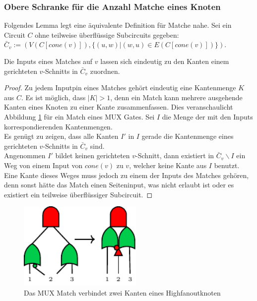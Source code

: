 \documentclass[11pt, a4paper, german]{article}
\begin{document}
\subsubsection{Obere Schranke für die Anzahl Matche eines Knoten}
\label{subsubsec:anzahl_matchings}
Folgendes Lemma legt eine äquivalente Definition für Matche nahe.
Sei ein Circuit $C$ ohne teilweise überflüssige Subcircuits gegeben: \\$\bar{C}_v := (V(C[cone(v)]), \{ (u,w) | (w,u) \in E(C[cone(v)])\})$.
\begin{lemma}{Die Inputs eines Matches auf $v$ lassen sich eindeutig zu den Kanten einem gerichteten $v$-Schnitts in $\bar{C}_v $} zuordnen.
\end{lemma}
\begin{proof}
Zu jedem Inputpin eines Matches gehört eindeutig eine Kantenmenge $K$ aus $C$. Es ist möglich, dass $|K| > 1$, denn ein Match kann mehrere ausgehende Kanten eines Knoten zu einer Kante zusammenfassen. Dies veranschaulicht Abbildung \ref{bild:mux_match} für ein Match eines MUX Gates.  Sei $I$ die Menge der mit den Inputs korrespondierenden Kantenmengen.\\
Es genügt zu zeigen, dass alle Kanten $I'$ in $I$ gerade die Kantenmenge eines gerichteten $v$-Schnitts in $\bar{C}_v$ sind. \\
Angenommen $I'$ bildet keinen gerichteten $v$-Schnitt, dann existiert in $\bar{C}_v\backslash I$ ein Weg von einem Input von $cone(v)$ zu $v$, welcher keine Kante aus $I$ benutzt. \\
Eine Kante dieses Weges muss jedoch zu einem der Inputs des Matches gehören, denn sonst hätte das Match einen Seiteninput, was nicht erlaubt ist oder es existiert ein teilweise überflüssiger Subcircuit. 
\end{proof}

\begin{figure}
		\includegraphics[width = 6cm]{pictures/compiled/mux_match}
		\caption{Das MUX Match verbindet zwei Kanten eines Highfanoutknoten}
		\label{bild:mux_match}
\end{figure}
\end{document}

